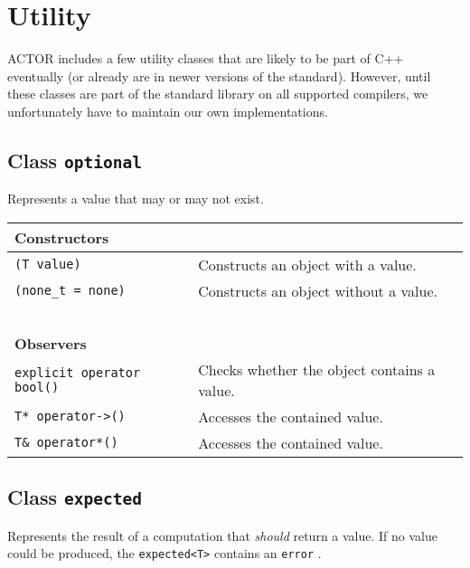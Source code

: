 \section{Utility}
\label{utility}

ACTOR includes a few utility classes that are likely to be part of C++
eventually (or already are in newer versions of the standard). However, until
these classes are part of the standard library on all supported compilers, we
unfortunately have to maintain our own implementations.

\subsection{Class \lstinline^optional^}
\label{optional}

Represents a value that may or may not exist.

\begin{center}
\begin{tabular}{ll}
  \textbf{Constructors} & ~ \\
  \hline
  \lstinline^(T value)^ & Constructs an object with a value. \\
  \hline
  \lstinline^(none_t = none)^ & Constructs an object without a value. \\
  \hline
  ~ & ~ \\ \textbf{Observers} & ~ \\
  \hline
  \lstinline^explicit operator bool()^ & Checks whether the object contains a value. \\
  \hline
  \lstinline^T* operator->()^ & Accesses the contained value. \\
  \hline
  \lstinline^T& operator*()^ & Accesses the contained value. \\
  \hline
\end{tabular}
\end{center}

\subsection{Class \lstinline^expected^}

Represents the result of a computation that \emph{should} return a value. If no
value could be produced, the \lstinline^expected<T>^ contains an
\lstinline^error^ .

